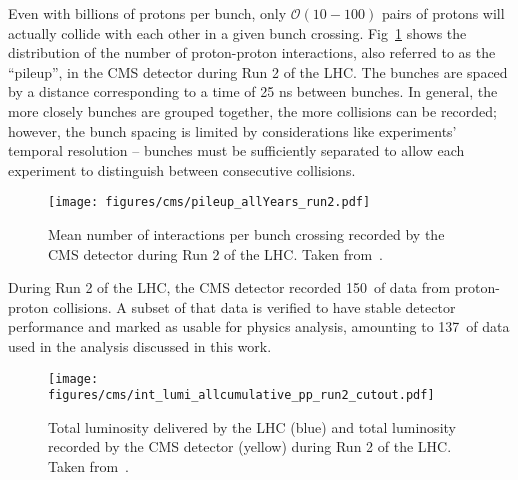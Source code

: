 Even with billions of protons per bunch, only $\mathcal O(10-100)$ pairs of protons will actually collide with each other in a given bunch crossing. %
Fig~\ref{fig:cms_pileup} shows the distribution of the number of proton-proton interactions, also referred to as the ``pileup'', in the CMS detector during Run 2 of the LHC. 
The bunches are spaced by a distance corresponding to a time of 25 ns between bunches.
In general, the more closely bunches are grouped together, the more collisions can be recorded; however, the bunch spacing is limited by considerations like experiments' temporal resolution -- bunches must be sufficiently separated to allow each experiment to distinguish between consecutive collisions.

\begin{figure} [htbp!]
    \centering
    \texttt{[image: figures/cms/pileup\_allYears\_run2.pdf]}
    \caption{Mean number of interactions per bunch crossing recorded by the CMS detector during Run 2 of the LHC. Taken from~\cite{public_lumi}.}
    \label{fig:cms_pileup}
\end{figure}

During Run 2 of the LHC, the CMS detector recorded 150~\fbinv of data from proton-proton collisions.
A subset of that data is verified to have stable detector performance and marked as usable for physics analysis, amounting to 137~\fbinv of data used in the analysis discussed in this work.

\begin{figure} [htbp!]
    \centering
    \texttt{[image: figures/cms/int\_lumi\_allcumulative\_pp\_run2\_cutout.pdf]}
    \caption{Total luminosity delivered by the LHC (blue) and total luminosity recorded by the CMS detector (yellow) during Run 2 of the LHC. Taken from~\cite{public_lumi}.}
    \label{fig:cms_lumi}
\end{figure}
